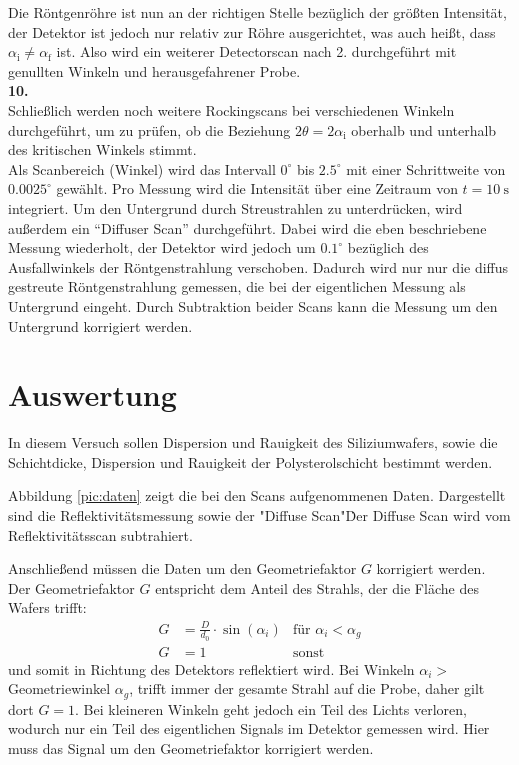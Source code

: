 Die Röntgenröhre ist nun an der richtigen Stelle bezüglich der größten Intensität, der Detektor ist jedoch nur relativ zur Röhre ausgerichtet, was auch heißt,
dass $\alpha_\text{i} \neq \alpha_\text{f}$ ist. Also wird ein weiterer Detectorscan nach 2. durchgeführt mit genullten Winkeln und herausgefahrener Probe.
\\ \textbf{10.}\\
Schließlich werden noch weitere Rockingscans bei verschiedenen Winkeln durchgeführt, um zu prüfen, ob die Beziehung $2\theta = 2\alpha_\text{i}$ oberhalb
und unterhalb des kritischen Winkels stimmt.%
\\
\noindent
Als Scanbereich (Winkel) wird das Intervall $0^\circ$ bis 
$2.5^\circ$ mit einer Schrittweite von $0.0025^\circ$ gewählt. Pro Messung wird die Intensität über eine Zeitraum von $t=\SI{10}{\second}$ integriert. 
Um den Untergrund durch Streustrahlen zu unterdrücken, wird außerdem ein ``Diffuser Scan'' durchgeführt. Dabei wird die eben beschriebene Messung wiederholt,
der Detektor wird jedoch um $0.1^\circ$ bezüglich des Ausfallwinkels der Röntgenstrahlung verschoben. Dadurch wird nur nur die diffus gestreute 
Röntgenstrahlung gemessen, die bei der eigentlichen Messung als Untergrund eingeht. Durch Subtraktion beider Scans kann die Messung um den Untergrund 
korrigiert werden.

\section{Auswertung}
In diesem Versuch sollen Dispersion und Rauigkeit des Siliziumwafers, sowie die Schichtdicke, Dispersion und Rauigkeit der Polysterolschicht bestimmt werden.


Abbildung \ref{pic:daten} zeigt die bei den Scans aufgenommenen Daten. Dargestellt sind die Reflektivitätsmessung sowie der "Diffuse Scan"\. Der Diffuse Scan wird vom Reflektivitätsscan subtrahiert.

Anschließend müssen die Daten um den Geometriefaktor $G$ korrigiert werden.
Der Geometriefaktor $G$ entspricht dem Anteil des Strahls, der die Fläche des Wafers trifft:
\begin{align}
	G &= \frac{D}{d_0}\cdot \sin(\alpha_i) &\text{für $\alpha_i < \alpha_g$}\\
	G &= 1 &\text{sonst}
\end{align}
 und somit in Richtung des Detektors reflektiert wird. Bei Winkeln $\alpha_i >$ Geometriewinkel $\alpha_g$, trifft immer der gesamte Strahl auf die Probe, daher gilt dort $G=1$. Bei kleineren Winkeln geht jedoch ein Teil des Lichts verloren, wodurch nur ein Teil des eigentlichen Signals im Detektor gemessen wird. Hier muss das Signal um den Geometriefaktor korrigiert werden.

